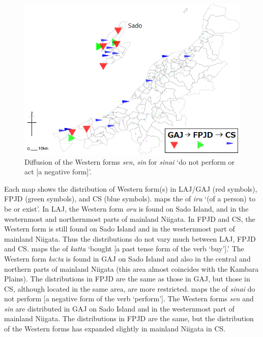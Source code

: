 \documentclass[output=paper]{LSP/langsci}
\begin{document}
\begin{figure}
\includegraphics[width=.75\textwidth]{illustrations/fuku2_fig2c}
\caption{Diffusion of the Western forms \textit{sen}, \textit{sin} for \textit{sinai} `do not perform or act [a negative form]'.}
\label{fig:2c}
\end{figure}

Each map shows the distribution of Western form(s) in \textsc{LAJ}/\textsc{GAJ} (red symbols), \textsc{FPJD} (green symbols), and \textsc{CS} (blue symbols).   maps the  of \textit{iru} `(of a person) to be or exist'.  In \textsc{LAJ}, the Western form \textit{oru} is found on Sado Island, and in the westernmost and northernmost parts of mainland Niigata.  In \textsc{FPJD} and \textsc{CS}, the Western form is still found on Sado Island and in the westernmost part of mainland Niigata.  Thus the distributions do not vary much between \textsc{LAJ}, \textsc{FPJD} and \textsc{CS}.   maps the  of \textit{katta} `bought [a past tense form of the verb `buy'].'  The Western form \textit{koːta} is found in \textsc{GAJ} on Sado Island and also in the central and northern parts of mainland Niigata (this area almost coincides with the Kambara Plains).  The distributions in \textsc{FPJD} are the same as those in \textsc{GAJ}, but those in \textsc{CS}, although located in the same area, are more restricted.   maps the  of \textit{sinai} {\textquotedbl}do not perform [a negative form of the verb `perform'].{\textquotedbl} The Western forms \textit{sen} and \textit{sin} are distributed in \textsc{GAJ} on Sado Island and in the westernmost part of mainland Niigata. The distributions in \textsc{FPJD} are the same, but the distribution of the Western forms has expanded slightly  in mainland Niigata in \textsc{CS}.
\end{document}
